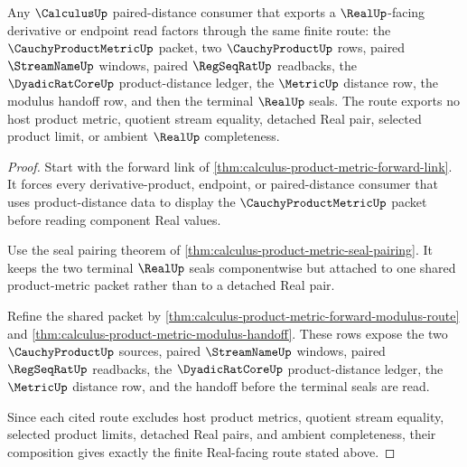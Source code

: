 \begin{theorem}
\label{thm:calculus-product-metric-real-route}
Any $\CalculusUp$ paired-distance consumer that exports a $\RealUp$-facing derivative or endpoint read factors through the same finite route: the $\CauchyProductMetricUp$ packet, two $\CauchyProductUp$ rows, paired $\StreamNameUp$ windows, paired $\RegSeqRatUp$ readbacks, the $\DyadicRatCoreUp$ product-distance ledger, the $\MetricUp$ distance row, the modulus handoff row, and then the terminal $\RealUp$ seals. The route exports no host product metric, quotient stream equality, detached Real pair, selected product limit, or ambient $\RealUp$ completeness.
\end{theorem}
\begin{proof}
Start with the forward link of \autoref{thm:calculus-product-metric-forward-link}. It forces every derivative-product, endpoint, or paired-distance consumer that uses product-distance data to display the $\CauchyProductMetricUp$ packet before reading component Real values.

Use the seal pairing theorem of \autoref{thm:calculus-product-metric-seal-pairing}. It keeps the two terminal $\RealUp$ seals componentwise but attached to one shared product-metric packet rather than to a detached Real pair.

Refine the shared packet by \autoref{thm:calculus-product-metric-forward-modulus-route} and \autoref{thm:calculus-product-metric-modulus-handoff}. These rows expose the two $\CauchyProductUp$ sources, paired $\StreamNameUp$ windows, paired $\RegSeqRatUp$ readbacks, the $\DyadicRatCoreUp$ product-distance ledger, the $\MetricUp$ distance row, and the handoff before the terminal seals are read.

Since each cited route excludes host product metrics, quotient stream equality, selected product limits, detached Real pairs, and ambient completeness, their composition gives exactly the finite Real-facing route stated above.
\end{proof}


